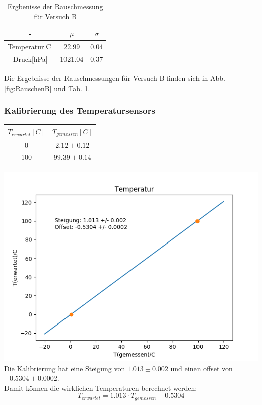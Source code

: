 \documentclass[12pt,a4paper]{article}
\begin{document}
\begin{table}
\begin{center}
\begin{tabular}{|c|c|c|}
\hline 
- & $\mu$ & $\sigma$\\ 
\hline 
Temperatur[C] & 22.99 & 0.04 \\ 
\hline 
Druck[hPa] & 1021.04 & 0.37\\ 
\hline 
\end{tabular}
\caption[Tabelle Rauschenmessung B]{Ergbenisse der Rauschmessung für Versuch B}
\label{tab:RauschenB}
\end{center}
\end{table}

Die Ergebnisse der Rauschmessungen für Versuch B finden sich in Abb. \ref{fig:RauschenB} und Tab. \ref{tab:RauschenB}.



\subsubsection{Kalibrierung des Temperatursensors}
\begin{tabular}{|c|c|}
\hline 
$T_{erwartet}[C]$ & $T_{gemessen}[C]$ \\ 
\hline 
0 & $2.12\pm0.12$ \\ 
\hline 
100 & $99.39\pm0.14$ \\ 
\hline 
\end{tabular} 

\includegraphics[width=\linewidth]{Bilder/KalibrationB}\\

Die Kalibrierung hat eine Steigung von $1.013\pm 0.002$ und einen offset von $-0.5304\pm 0.0002$.\\
Damit können die wirklichen Temperaturen berechnet werden:
\begin{equation}
T_{erwartet}=1.013\cdot T_{gemessen}-0.5304
\end{equation}
\end{document}

